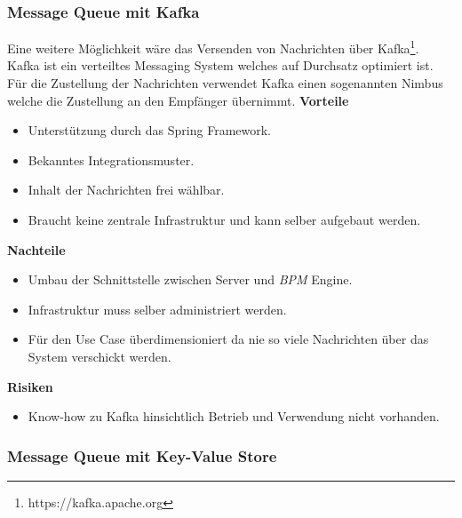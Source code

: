 \subsubsection{Message Queue mit Kafka}

Eine weitere Möglichkeit wäre das Versenden von Nachrichten über Kafka\footnote{https://kafka.apache.org}. Kafka ist ein verteiltes Messaging System welches auf Durchsatz optimiert ist. Für die Zustellung der Nachrichten verwendet Kafka einen sogenannten Nimbus welche die Zustellung an den Empfänger übernimmt.
\newline
\newline
\textbf{Vorteile}
\begin{itemize}
	\item Unterstützung durch das Spring Framework.
	\item Bekanntes Integrationsmuster.
	\item Inhalt der Nachrichten frei wählbar.
	\item Braucht keine zentrale Infrastruktur und kann selber aufgebaut werden.
\end{itemize}
\newpage
\textbf{Nachteile}
\begin{itemize}
	\item Umbau der Schnittstelle zwischen Server und \textit{\gls{BPM}} Engine.
	\item Infrastruktur muss selber administriert werden.
	\item Für den Use Case überdimensioniert da nie so viele Nachrichten über das System verschickt werden.
\end{itemize}
\textbf{Risiken}
\begin{itemize}
	\item Know-how zu Kafka hinsichtlich Betrieb und Verwendung nicht vorhanden.
\end{itemize}

\subsubsection{Message Queue mit Key-Value Store}

